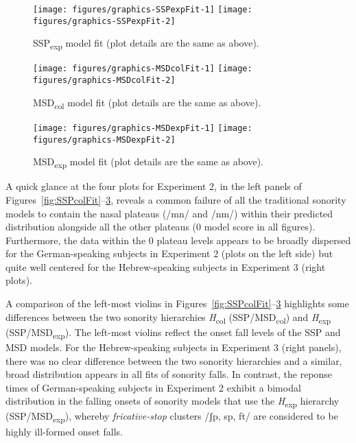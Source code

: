 \begin{figure}[p]
\texttt{[image: figures/graphics-SSPexpFit-1]} \texttt{[image: figures/graphics-SSPexpFit-2]} \caption{SSP\textsubscript{exp} model fit (plot details are the same as above).}\label{fig:SSPexpFit}
\end{figure}

\begin{figure}[p]
\texttt{[image: figures/graphics-MSDcolFit-1]} \texttt{[image: figures/graphics-MSDcolFit-2]} \caption{MSD\textsubscript{col} model fit (plot details are the same as above).}\label{fig:MSDcolFit}
\end{figure}

\begin{figure}[p]
\texttt{[image: figures/graphics-MSDexpFit-1]} \texttt{[image: figures/graphics-MSDexpFit-2]} \caption{MSD\textsubscript{exp} model fit (plot details are the same as above).}\label{fig:MSDexpFit}
\end{figure}

A quick glance at the four plots for Experiment 2, in the left panels of Figures~\ref{fig:SSPcolFit}--\ref{fig:MSDexpFit}, reveals a common failure of all the traditional sonority models
to contain the nasal plateaus (/mn/ and /nm/) within their predicted distribution alongside all the other plateaus (0 model score in all figures). Furthermore, the data within the 0 plateau levels appears to be broadly dispersed for the German-speaking subjects in Experiment 2 (plots on the left side) but quite well centered for the Hebrew-speaking subjects in Experiment 3 (right plots).

A comparison of the left-most violins in Figures~\ref{fig:SSPcolFit}--\ref{fig:MSDexpFit} highlights some differences between the two sonority hierarchies \emph{H}\textsubscript{col} (SSP\slash MSD\textsubscript{col}) and \emph{H}\textsubscript{exp} (SSP\slash MSD\textsubscript{exp}).
The left-most violins reflect the onset fall levels of the SSP and MSD models.
For the Hebrew-speaking subjects in Experiment 3 (right panels), there was no clear difference between the two sonority hierarchies and a similar, broad distribution appears in all fits of sonority falls. In contrast, the reponse times of German-speaking subjects in Experiment 2 exhibit a bimodal distribution in the falling onsets of sonority models that use the \emph{H}\textsubscript{exp} hierarchy (SSP/MSD\textsubscript{exp}), whereby \emph{fricative-stop} clusters /ʃp, sp, ft/ are considered to be highly ill-formed onset falls.

